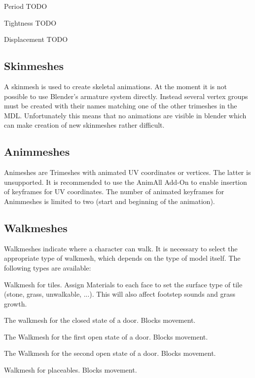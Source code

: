 \begin{property}{Period} 
TODO
\end{property}
\begin{property}{Tightness} 
TODO
\end{property}
\begin{property}{Displacement} 
TODO
\end{property}


\subsection{Skinmeshes}
A skinmesh is used to create skeletal animations. At the moment it is not 
possible to use Blender's armature system directly. Instead several vertex groups 
must be created with their names matching one of the other trimeshes in the MDL. 
Unfortunately this means that no animations are visible in blender which can make 
creation of new skinmeshes rather difficult.


\subsection{Animmeshes}
Animeshes are Trimeshes with animated UV coordinates or vertices. The latter is unsupported. 
It is recommended to use the AnimAll Add-On to enable insertion of keyframes 
for UV coordinates. The number of animated keyframes for Animmeshes is limited to 
two (start and beginning of 
the animation).


\subsection{Walkmeshes}
Walkmeshes indicate where a character can walk. It is necessary to select 
the appropriate type of walkmesh, which depends on the type of model itself. 
The following types are available:
\begin{description}[leftmargin=10em,style=nextline]
    \item[Tileset] Walkmesh for tiles. Assign Materials to each face to set the
                   surface type of tile (stone, grass, unwalkable, ...).
                   This will also affect footstep sounds and grass growth.
    \item[Door: Closed] The walkmesh for the closed state of a door. Blocks movement.
    \item[Door: Open 1] The Walkmesh for the first open state of a door. Blocks movement.
    \item[Door: Open 2] The Walkmesh for the second open state of a door. Blocks movement.
    \item[Placeable] Walkmesh for placeables. Blocks movement.
\end{description}


